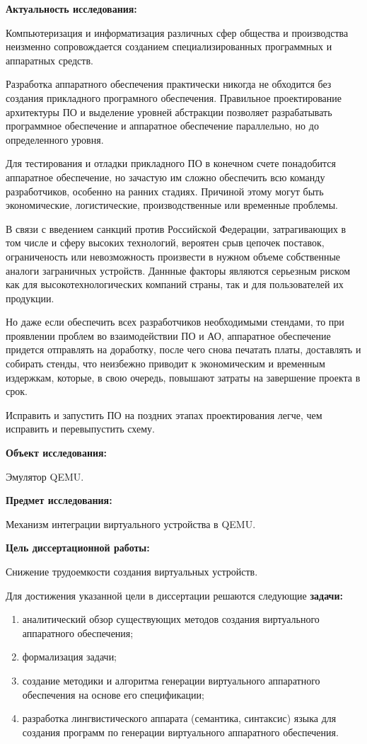 \textbf{Актуальность исследования:}

Компьютеризация и информатизация различных сфер общества и производства неизменно
сопровождается созданием специализированных программных и аппаратных средств.

Разработка аппаратного обеспечения практически никогда не обходится без создания
прикладного програмного обеспечения.
Правильное проектирование архитектуры ПО и выделение уровней абстракции позволяет
разрабатывать программное обеспечение и аппаратное обеспечение параллельно, но
до определенного уровня.

Для тестирования и отладки прикладного ПО в конечном счете понадобится аппаратное обеспечение,
но зачастую им сложно обеспечить всю команду разработчиков, особенно на ранних стадиях.
Причиной этому могут быть экономические, логистические, производственные или временные проблемы.

В связи с введением санкций против Российской Федерации, затрагивающих
в том числе и сферу высоких технологий, вероятен срыв цепочек поставок,
ограниченость или невозможность произвести в нужном объеме собственные
аналоги заграничных устройств.
Даннные факторы являются серьезным риском как для высокотехнологических
компаний страны, так и для пользователей их продукции.

Но даже если обеспечить всех разработчиков необходимыми стендами, то при проявлении
проблем во взаимодействии ПО и АО, аппаратное обеспечение придется отправлять на доработку,
после чего снова печатать платы, доставлять и собирать стенды, что неизбежно приводит к экономическим
и временным издержкам, которые, в свою очередь, повышают затраты на завершение проекта в срок.

Исправить и запустить ПО на поздних этапах проектирования легче, чем исправить и перевыпустить схему.

\textbf{Объект исследования:}

Эмулятор QEMU.

\textbf{Предмет исследования:}

Механизм интеграции виртуального устройства в QEMU.

\textbf{Цель диссертационной работы:}

Снижение трудоемкости создания виртуальных устройств.

Для достижения указанной цели в диссертации решаются
следующие \textbf{задачи:}

\begin{enumerate}[label={\arabic*)}]
    \item аналитический обзор существующих методов создания виртуального аппаратного обеспечения;
    \item формализация задачи;
    \item создание методики и алгоритма генерации виртуального аппаратного обеспечения на основе его спецификации;
    \item разработка лингвистического аппарата (семантика, синтаксис) языка для создания программ по генерации виртуального
        аппаратного обеспечения.
\end{enumerate}

